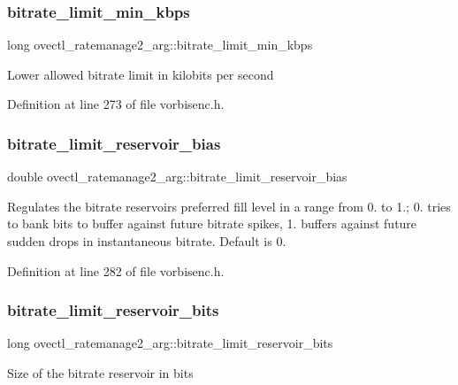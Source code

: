 \subsubsection{\texorpdfstring{bitrate\_limit\_min\_kbps}{bitrate\_limit\_min\_kbps}}
{\footnotesize\ttfamily long ovectl\+\_\+ratemanage2\+\_\+arg\+::bitrate\+\_\+limit\+\_\+min\+\_\+kbps}

Lower allowed bitrate limit in kilobits per second 

Definition at line 273 of file vorbisenc.\+h.

\mbox{\label{structovectl__ratemanage2__arg_a5567fde1798b1e80e40a77565b4b44f4}} 
\subsubsection{\texorpdfstring{bitrate\_limit\_reservoir\_bias}{bitrate\_limit\_reservoir\_bias}}
{\footnotesize\ttfamily double ovectl\+\_\+ratemanage2\+\_\+arg\+::bitrate\+\_\+limit\+\_\+reservoir\+\_\+bias}

Regulates the bitrate reservoir\textquotesingle{}s preferred fill level in a range from 0. to 1.; 0. tries to bank bits to buffer against future bitrate spikes, 1. buffers against future sudden drops in instantaneous bitrate. Default is 0. 

Definition at line 282 of file vorbisenc.\+h.

\mbox{\label{structovectl__ratemanage2__arg_a75e496acac882e156137de9d1200ebd7}} 
\subsubsection{\texorpdfstring{bitrate\_limit\_reservoir\_bits}{bitrate\_limit\_reservoir\_bits}}
{\footnotesize\ttfamily long ovectl\+\_\+ratemanage2\+\_\+arg\+::bitrate\+\_\+limit\+\_\+reservoir\+\_\+bits}

Size of the bitrate reservoir in bits 

